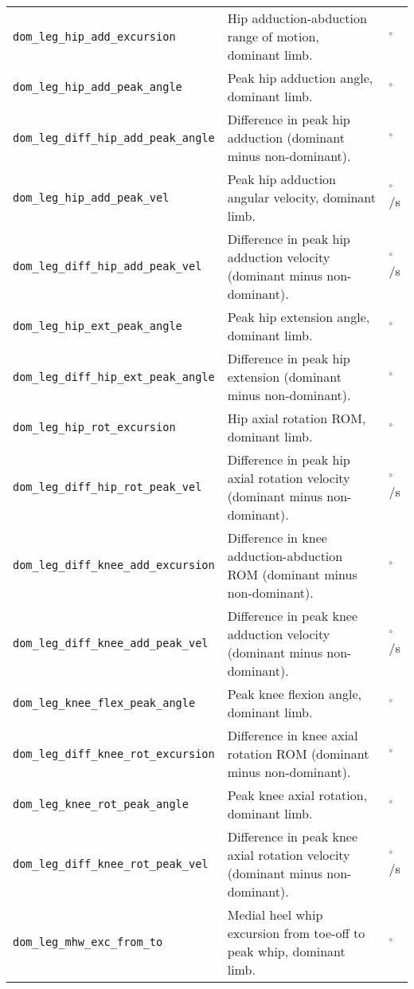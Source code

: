 {\begin{longtable}{@{}p{} p{} p{}@{}}
    \texttt{dom\_leg\_hip\_add\_excursion} & Hip adduction-abduction range of motion, dominant limb. & $^\circ$ \\
    \texttt{dom\_leg\_hip\_add\_peak\_angle} & Peak hip adduction angle, dominant limb. & $^\circ$ \\
    \texttt{dom\_leg\_diff\_hip\_add\_peak\_angle} & Difference in peak hip adduction (dominant minus non-dominant). & $^\circ$ \\
    \texttt{dom\_leg\_hip\_add\_peak\_vel} & Peak hip adduction angular velocity, dominant limb. & $^\circ$/s \\
    \texttt{dom\_leg\_diff\_hip\_add\_peak\_vel} & Difference in peak hip adduction velocity (dominant minus non-dominant). & $^\circ$/s \\
    \texttt{dom\_leg\_hip\_ext\_peak\_angle} & Peak hip extension angle, dominant limb. & $^\circ$ \\
    \texttt{dom\_leg\_diff\_hip\_ext\_peak\_angle} & Difference in peak hip extension (dominant minus non-dominant). & $^\circ$ \\
    \texttt{dom\_leg\_hip\_rot\_excursion} & Hip axial rotation ROM, dominant limb. & $^\circ$ \\
    \texttt{dom\_leg\_diff\_hip\_rot\_peak\_vel} & Difference in peak hip axial rotation velocity (dominant minus non-dominant). & $^\circ$/s \\
    \texttt{dom\_leg\_diff\_knee\_add\_excursion} & Difference in knee adduction-abduction ROM (dominant minus non-dominant). & $^\circ$ \\
    \texttt{dom\_leg\_diff\_knee\_add\_peak\_vel} & Difference in peak knee adduction velocity (dominant minus non-dominant). & $^\circ$/s \\
    \texttt{dom\_leg\_knee\_flex\_peak\_angle} & Peak knee flexion angle, dominant limb. & $^\circ$ \\
    \texttt{dom\_leg\_diff\_knee\_rot\_excursion} & Difference in knee axial rotation ROM (dominant minus non-dominant). & $^\circ$ \\
    \texttt{dom\_leg\_knee\_rot\_peak\_angle} & Peak knee axial rotation, dominant limb. & $^\circ$ \\
    \texttt{dom\_leg\_diff\_knee\_rot\_peak\_vel} & Difference in peak knee axial rotation velocity (dominant minus non-dominant). & $^\circ$/s \\
    \texttt{dom\_leg\_mhw\_exc\_from\_to} & Medial heel whip excursion from toe-off to peak whip, dominant limb. & $^\circ$ \\

\end{longtable}}
